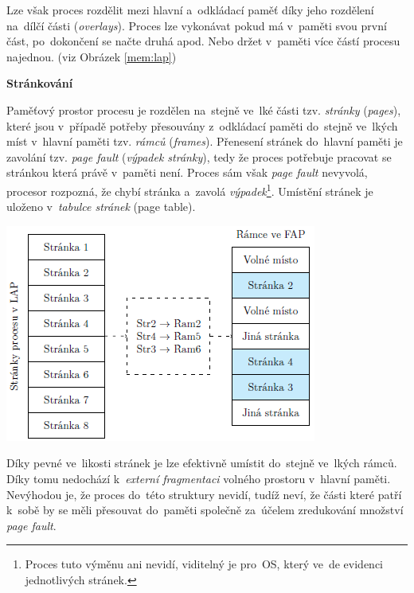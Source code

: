 Lze však proces rozdělit mezi hlavní a~odkládací paměť díky jeho rozdělení na~dílčí části (\emph{overlays}). Proces lze vykonávat pokud má v~paměti svou první část, po~dokončení se načte druhá apod. Nebo držet v~paměti více částí procesu najednou. (viz Obrázek \ref{mem:lap})

\begin{Large}
	\vspace{0,5cm}
	\textbf{Stránkování}
\end{Large}

Paměťový prostor procesu je rozdělen na~stejně ve~lké části tzv. \emph{stránky} (\emph{pages}), které jsou v~případě potřeby přesouvány z~odkládací paměti do~stejně ve~lkých míst v~hlavní paměti tzv. \emph{rámců} (\emph{frames}). Přenesení stránek do~hlavní paměti je zavolání tzv. \emph{page fault} (\emph{výpadek stránky}), tedy že proces potřebuje pracovat se stránkou která právě v~paměti není. Proces sám však \emph{page fault} nevyvolá, procesor rozpozná, že chybí stránka a~zavolá \emph{výpadek}\footnote{Proces tuto výměnu ani nevidí, viditelný je pro~OS, který ve~de evidenci jednotlivých stránek.}. Umístění stránek je uloženo v~\emph{tabulce stránek} (page table).

\begin{center}
	\includegraphics[scale=1]{images/mem_page_table.png}
\end{center}

Díky pevné ve~likosti stránek je lze efektivně umístit do~stejně ve~lkých rámců. Díky tomu nedochází k~\emph{externí fragmentaci} volného prostoru v~hlavní paměti. Nevýhodou je, že proces do~této struktury nevidí, tudíž neví, že části které patří k~sobě by se měli přesouvat do~paměti společně za~účelem zredukování množství \emph{page fault}.

\vspace{0,5cm}

